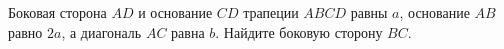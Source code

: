 \begin{ex}
	\begin{condition}
		Боковая сторона \( AD  \) и основание \( CD  \) трапеции \( ABCD  \) равны \( a \), основание \( AB  \) равно \( 2a \), а диагональ \( AC \) равна \( b \). Найдите боковую сторону \( BC \).
	\end{condition}
\end{ex}